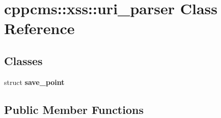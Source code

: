 \hypertarget{classcppcms_1_1xss_1_1uri__parser}{\section{cppcms\-:\-:xss\-:\-:uri\-\_\-parser Class Reference}
\label{classcppcms_1_1xss_1_1uri__parser}
}
\subsection*{Classes}
\begin{DoxyCompactItemize}
\item 
struct {\bfseries save\-\_\-point}
\end{DoxyCompactItemize}
\subsection*{Public Member Functions}
